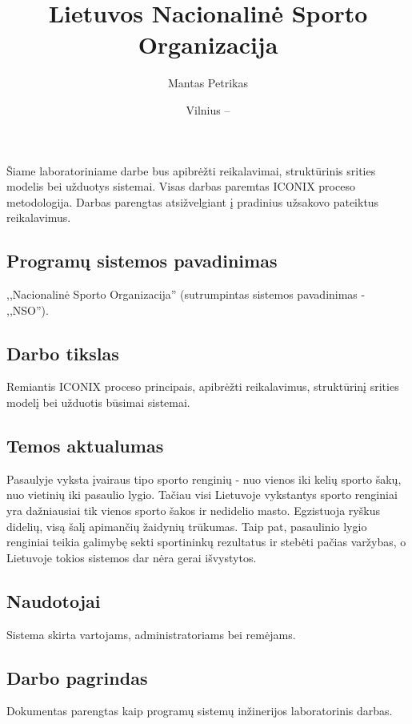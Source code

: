 \documentclass{VUMIFPSkursinis}
\title{Lietuvos Nacionalinė Sporto Organizacija}
\author{Mantas Petrikas}
\date{Vilnius – \the\year}
\begin{document}
    \maketitle
    \tableofcontents
    
     \label{anotacija}
		Šiame laboratoriniame darbe bus apibrėžti reikalavimai, struktūrinis srities modelis bei užduotys sistemai. Visas darbas paremtas ICONIX proceso metodologija.
		Darbas parengtas atsižvelgiant į pradinius užsakovo pateiktus reikalavimus.
     \label{ivadas}
        \subsection*{Programų sistemos pavadinimas} \label{ivadas_psPavadinimas}
            ,,Nacionalinė Sporto Organizacija'' (sutrumpintas sistemos pavadinimas - ,,NSO'').
        \subsection*{Darbo tikslas} \label{ivadas_darboTikslas}
            Remiantis ICONIX proceso principais, apibrėžti reikalavimus, struktūrinį srities modelį bei užduotis būsimai sistemai.
        \subsection*{Temos aktualumas} \label{ivadas_aktualumas}
            Pasaulyje vyksta įvairaus tipo sporto renginių - nuo vienos iki kelių sporto šakų, nuo vietinių iki pasaulio lygio. Tačiau visi Lietuvoje vykstantys sporto renginiai yra dažniausiai tik vienos sporto šakos ir nedidelio masto. Egzistuoja ryškus didelių, visą šalį apimančių žaidynių trūkumas. Taip pat, pasaulinio lygio renginiai teikia galimybę sekti sportininkų rezultatus ir stebėti pačias varžybas, o Lietuvoje tokios sistemos dar nėra gerai išvystytos.
        \subsection*{Naudotojai} \label{ivadas_naudotojai}
            Sistema skirta vartojams, administratoriams bei remėjams.
        \subsection*{Darbo pagrindas} \label{ivadas_pagrindas}
            Dokumentas parengtas kaip programų sistemų inžinerijos laboratorinis darbas.
\end{document}
